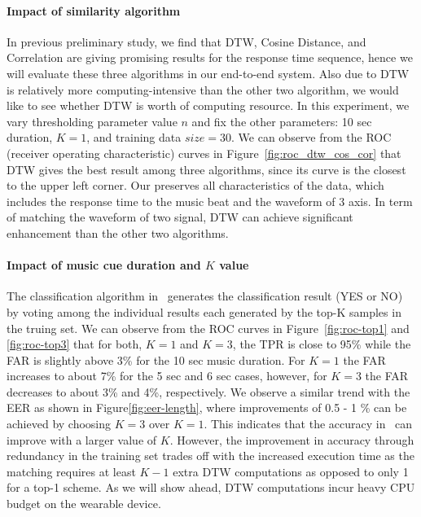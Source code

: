 \paragraph{Impact of similarity algorithm}
In previous preliminary study, we find that DTW, Cosine Distance, and Correlation are giving promising results for the response time sequence, hence we will evaluate these three algorithms in our end-to-end system. Also due to DTW is relatively more computing-intensive than the other two algorithm, we would like to see whether DTW  is worth of computing resource. In this experiment, we vary thresholding parameter value $n$ and fix the other parameters: 10 sec duration, $K = 1$, and  training data $size = 30$. We can observe from the ROC 
(receiver operating characteristic) curves in Figure~\ref{fig:roc_dtw_cos_cor} that DTW gives the best result among three algorithms, since its curve is the closest to the upper left corner. Our preserves all characteristics of the data, which includes the response time to the music beat and the waveform of 3 axis. In term of matching the waveform of two signal, DTW can achieve significant enhancement than the other two algorithms. 
\paragraph{Impact of music cue duration and $K$ value}

The classification algorithm in \systemname~generates the classification result (YES or NO) by voting among the individual results each generated by the top-K samples in the truing set. We can observe from the ROC curves in Figure~\ref{fig:roc-top1} and \ref{fig:roc-top3} that 
for both, $K=1$ and $K=3$, the TPR is close to 95\% while the FAR is slightly 
above 3\% for the 10 sec music duration. For $K = 1$ the FAR increases to 
about 7\% for the 5 sec and 6 sec cases, however, for $K = 3$ the FAR 
decreases to about 3\% and 4\%, respectively. 
We observe a similar trend with the EER as shown in 
Figure\ref{fig:eer-length}, where improvements of 0.5 - 1 \% 
can be achieved by choosing $K = 3$ over $K = 1$.
This indicates that the accuracy in \systemname~can improve with a larger 
value of $K$. However, the improvement in accuracy through redundancy in the 
training set trades off with the increased execution time as the 
matching requires at least $K - 1$  extra DTW computations as opposed to only 
1 for a top-1 scheme. As we will show ahead, DTW computations incur heavy CPU 
budget on the wearable device. 

